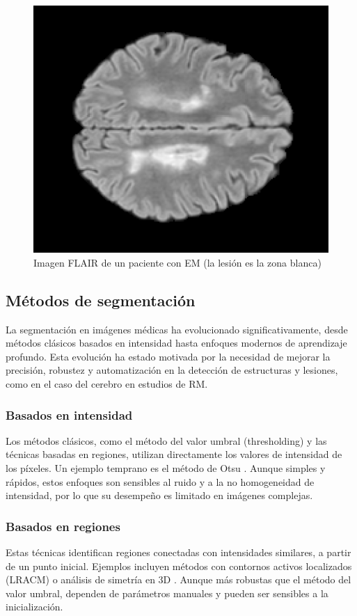 \documentclass[../main.tex]{subfiles}
\begin{document}
\begin{figure}
    \centering
    \includegraphics[width=0.5\linewidth]{imgs/arte/mri-1.png}
    \caption{Imagen FLAIR de un paciente con EM (la lesión es la zona blanca)}
    \label{fig:flair-ms}
\end{figure}

\subsection{Métodos de segmentación}
La segmentación en imágenes médicas ha evolucionado significativamente, desde métodos clásicos basados en intensidad hasta enfoques modernos de aprendizaje profundo. Esta evolución ha estado motivada por la necesidad de mejorar la precisión, robustez y automatización en la detección de estructuras y lesiones, como en el caso del cerebro en estudios de RM.

\subsubsection{Basados en intensidad}
Los métodos clásicos, como el método del valor umbral (thresholding) y las técnicas basadas en regiones, utilizan directamente los valores de intensidad de los píxeles. Un ejemplo temprano es el método de Otsu \cite{Otsu}. Aunque simples y rápidos, estos enfoques son sensibles al ruido y a la no homogeneidad de intensidad, por lo que su desempeño es limitado en imágenes complejas.

\subsubsection{Basados en regiones}
Estas técnicas identifican regiones conectadas con intensidades similares, a partir de un punto inicial. Ejemplos incluyen métodos con contornos activos localizados (LRACM) \cite{ilunga2017automatic} o análisis de simetría en 3D \cite{kermi2018fully}. Aunque más robustas que el método del valor umbral, dependen de parámetros manuales y pueden ser sensibles a la inicialización.
\end{document}
